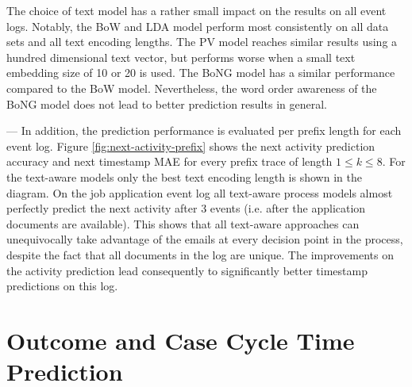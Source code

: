 The choice of text model has a rather small impact on the results on all event logs.
Notably, the BoW and LDA model perform most consistently on all data sets and all text encoding lengths.
The PV model reaches similar results using a hundred dimensional text vector, but performs worse when a small text embedding size of 10 or 20 is used.
The BoNG model has a similar performance compared to the BoW model.
Nevertheless, the word order awareness of the BoNG model does not lead to better prediction results in general.

---
In addition, the prediction performance is evaluated per prefix length for each event log.
Figure \ref{fig:next-activity-prefix} shows the next activity prediction accuracy and next timestamp MAE for every prefix trace of length $1 \leq k \leq 8$.
For the text-aware models only the best text encoding length is shown in the diagram.
On the job application event log all text-aware process models almost perfectly predict the next activity after 3 events (i.e. after the application documents are available).
This shows that all text-aware approaches can unequivocally take advantage of the emails at every decision point in the process, despite the fact that all documents in the log are unique.
The improvements on the activity prediction lead consequently to significantly better timestamp predictions on this log.



\section{Outcome and Case Cycle Time Prediction}

